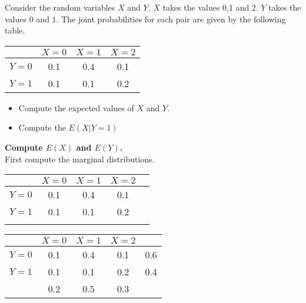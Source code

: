 \documentclass[a4paper,12pt]{article}
\begin{document}

\large
Consider the random variables $X$ and $Y$. $X$ takes the values 0,1 and 2. $Y$ takes the values $0$ and $1$.
The joint probabilities for each pair are given by the following table.
\begin{center}
\begin{tabular}{|c|c|c|c|}
\hline  & $X=0$ & $X=1$ & $X=2$  \\ 
\hline $Y=0$ & 0.1  & 0.4 & 0.1 \\ 
\hline  $Y=1$ & 0.1 & 0.1 & 0.2 \\ 
\hline 
\end{tabular} 
\end{center}
\begin{itemize}
\item Compute the expected values of $X$ and $Y$.
\item Compute the $E(X|Y=1)$
\end{itemize}



\medskip 

\large

\noindent \textbf{Compute $E(X)$ and $E(Y)$.}\\
First compute the marginal distributions.

\begin{center}
\begin{tabular}{|c|c|c|c||c|}
\hline  & $X=0$ & $X=1$ & $X=2$  &\phantom{spaces}\\ 
\hline $Y=0$ & 0.1  & 0.4 & 0.1 &\\ 
\hline  $Y=1$ & 0.1 & 0.1 & 0.2 & \\ \hline
\hline & & & & \\
\hline 
\end{tabular} 
\end{center}



\medskip 



\begin{center}
\begin{tabular}{|c|c|c|c||c|}
\hline  & $X=0$ & $X=1$ & $X=2$  &\phantom{spaces}\\ 
\hline $Y=0$ & 0.1  & 0.4 & 0.1 & 0.6\\ 
\hline  $Y=1$ & 0.1 & 0.1 & 0.2 & 0.4\\ \hline
\hline & 0.2& 0.5& 0.3& \\
\hline 
\end{tabular} 
\end{center}
\newpage 
\end{document}
